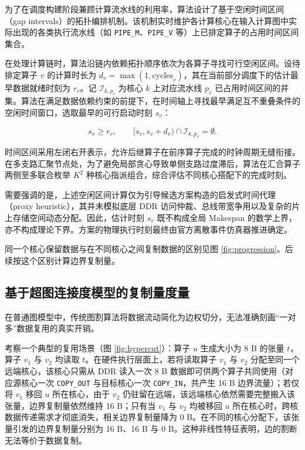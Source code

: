 \documentclass[anonymous,withtoc]{gmcm2026}
\begin{document}
为了在调度构建阶段兼顾计算流水线的利用率，算法设计了基于空闲时间区间（gap intervals）的拓扑编排机制。该机制实时维护各计算核心在输入计算图中实际出现的各类执行流水线（如 \texttt{PIPE\_M}、\texttt{PIPE\_V} 等）上已排定算子的占用时间区间集合。

在处理计算链时，算法沿链内依赖拓扑顺序依次为各算子寻找可行空闲区间。设待排定算子 \(v\) 的计算时长为 \(d_v = \max(1, \text{cycles}_v)\)，其在当前部分调度下的估计最早数据就绪时刻为 \(r_v\)。记 \(\mathcal{I}_{k, p_v}\) 为核心 \(k\) 上对应流水线 \(p_v\) 已占用时间区间的并集。算法在满足数据依赖约束的前提下，在时间轴上寻找最早满足互不重叠条件的空闲时间窗口，选取最早的可行启动时刻 \(s_v\)：

\begin{equation}
s_v \ge r_v, \qquad [s_v, s_v + d_v) \cap \mathcal{I}_{k, p_v} = \emptyset.
\end{equation}

时间区间采用左闭右开表示，允许后继算子在前序算子完成的时钟周期无缝衔接。在多支路汇聚节点处，为了避免局部贪心导致单侧支路过度滞后，算法在汇合算子两侧至多联合枚举 \(K^2\) 种核心指派组合，综合评估不同核心搭配下的完成时刻。

需要强调的是，上述空闲区间计算仅为引导候选方案构造的启发式时间代理（proxy heuristic），其并未模拟底层 DDR 访问仲裁、总线带宽争用以及复杂的片上存储空间动态分配。因此，估计时刻 \(s_v\) 既不构成全局 Makespan 的数学上界，亦不构成理论下界。方案的物理执行时刻最终由官方离散事件仿真器推进确定。

同一个核心保留数据与在不同核心之间复制数据的区别见图 \ref{fig:progression}。后续按这个区别计算边界复制量。

\subsection{基于超图连接度模型的复制量度量}

在普通图模型中，传统图割算法将数据流动简化为边权切分，无法准确刻画``一对多''数据复用的真实开销。

考察一个典型的复用场景（图 \ref{fig:hypercut}）：算子 \(u\) 生成大小为 8 B 的张量 \(t\)，算子 \(v_1\) 与 \(v_2\) 均读取 \(t\)。在硬件执行层面上，若将读取算子 \(v_1\) 与 \(v_2\) 分配至同一个远端核心，该核心只需从 DDR 读入一次 8 B 数据即可供两个算子共同使用（对应源核心一次 \texttt{COPY\_OUT} 与目标核心一次 \texttt{COPY\_IN}，共产生 16 B 边界流量）；若仅将 \(v_1\) 移回 \(u\) 所在核心，由于 \(v_2\) 仍驻留在远端，该远端核心依然需要完整搬入该张量，边界复制量依然维持 16 B；只有当 \(v_1\) 与 \(v_2\) 均被移回 \(u\) 所在核心时，跨核数据传递需求才彻底消失，相关边界复制量降为 0 B。在不同的核心分配下，该张量引发的边界复制量分别为 16 B、16 B 与 0 B。这种非线性特征表明，边的割断无法等价于数据复制。
\end{document}
